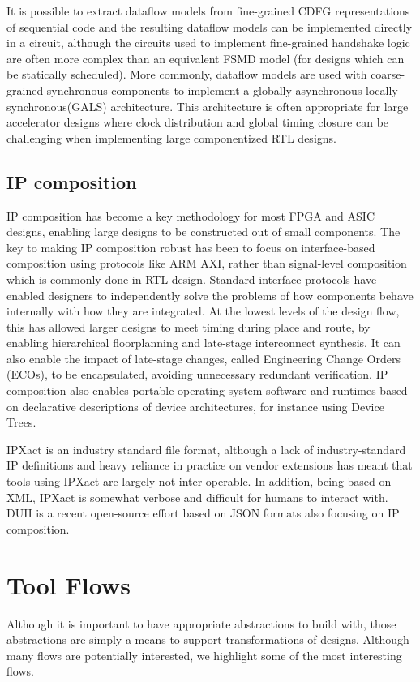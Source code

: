 \documentclass{tufte-handout}
\begin{document}
It is possible to extract dataflow models from fine-grained CDFG representations of sequential code\cite{josipovic18hls} and the resulting dataflow models can be implemented directly in a circuit, although the circuits used to implement fine-grained handshake logic are often more complex than an equivalent FSMD model (for designs which can be statically scheduled).  More commonly, dataflow models are used with coarse-grained synchronous components to implement a globally asynchronous-locally synchronous(GALS) architecture.  This architecture is often appropriate for large accelerator designs where clock distribution and global timing closure can be challenging when implementing large componentized RTL designs.

\subsection{IP composition}\label{sec:ipi}
IP composition has become a key methodology for most FPGA and ASIC designs, enabling large designs to be constructed out of small components.  The key to making IP composition robust has been to focus on interface-based composition using protocols like ARM AXI, rather than signal-level composition which is commonly done in RTL design.  Standard interface protocols have enabled designers to independently solve the problems of how components behave internally with how they are integrated.  At the lowest levels of the design flow, this has allowed larger designs to meet timing during place and route, by enabling hierarchical floorplanning and late-stage interconnect synthesis.  It can also enable the impact of late-stage changes, called Engineering Change Orders (ECOs), to be encapsulated, avoiding unnecessary redundant verification.  IP composition also enables portable operating system software and runtimes based on declarative descriptions of device architectures, for instance using Device Trees\cite{deviceTrees}.

IPXact\cite{IPXact} is an industry standard file format, although a lack of industry-standard IP definitions and heavy reliance in practice on vendor extensions has meant that tools using IPXact are largely not inter-operable.  In addition, being based on XML, IPXact is somewhat verbose and difficult for humans to interact with.  DUH\cite{DUH} is a recent open-source effort based on JSON formats also focusing on IP composition.

\section{Tool Flows}\label{sec:flows}
Although it is important to have appropriate abstractions to build with, those abstractions are simply a means to support transformations of designs.  Although many flows are potentially interested, we highlight some of the most interesting flows.
\end{document}

